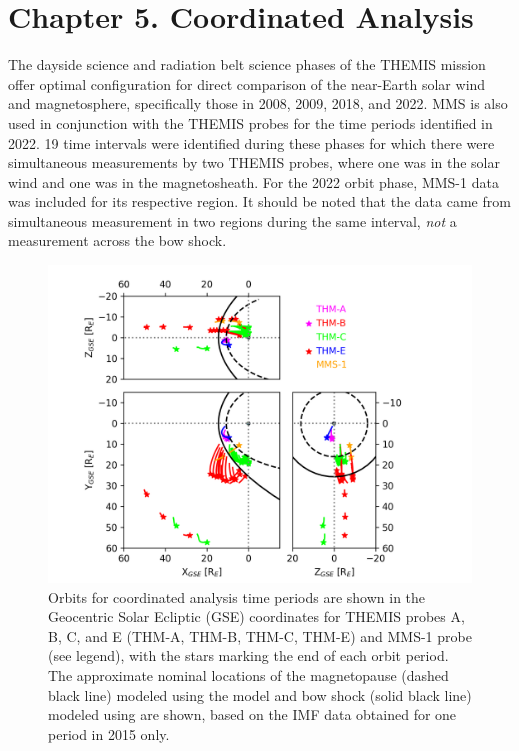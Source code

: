 \chapter{Chapter 5. Coordinated Analysis}

The dayside science and radiation belt science phases of the THEMIS mission offer optimal configuration for direct comparison of the near-Earth solar wind and magnetosphere, specifically those in 2008, 2009, 2018, and 2022. MMS is also used in conjunction with the THEMIS probes for the time periods identified in 2022. 19 time intervals were identified during these phases for which there were simultaneous measurements by two THEMIS probes, where one was in the solar wind and one was in the magnetosheath. For the 2022 orbit phase, MMS-1 data was included for its respective region. It should be noted that the data came from simultaneous measurement in two regions during the same interval, \textit{not} a measurement across the bow shock. 

\begin{figure}
    \centering
    \includegraphics[width=\textwidth]{Figures/Orbits/all_TE_orbits_xy_xz_yz_coordinated.png}
    \caption[Orbits for coordinated observation periods]{Orbits for coordinated analysis time periods are shown in the Geocentric Solar Ecliptic (GSE) coordinates for THEMIS probes A, B, C, and E (THM-A, THM-B, THM-C, THM-E) and MMS-1 probe (see legend), with the stars marking the end of each orbit period. The approximate nominal locations of the magnetopause (dashed black line) modeled using the \cite{Shue:1997} model and bow shock (solid black line) modeled using \cite{SlavinHolzer:1984} are shown, based on the IMF data obtained for one period in 2015 only.}
    \label{fig:coordinated-orbits-plot}
\end{figure}


